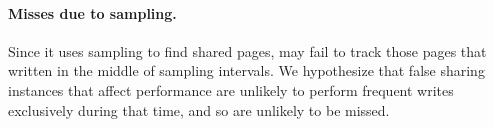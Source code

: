 \paragraph{Misses due to sampling.}  Since it uses sampling to find shared pages, \SheriffDetect{} may fail to track those pages that written in the middle of sampling intervals. We hypothesize that false sharing instances that affect performance are unlikely to perform frequent writes exclusively during that time, and so are unlikely to be missed.
